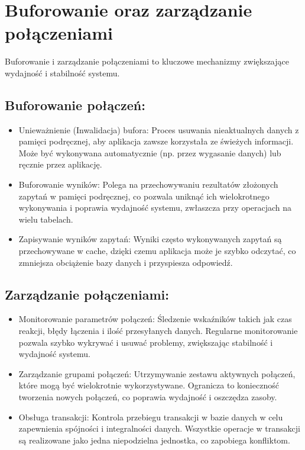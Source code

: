 \documentclass[a4paper,11pt,polish]{sphinxmanual}
\begin{document}
\section{Buforowanie oraz zarządzanie połączeniami}
\label{\detokenize{Wydajnosc-Skalowanie-i-Replikacja/index:buforowanie-oraz-zarzadzanie-polaczeniami}}
\sphinxAtStartPar
Buforowanie i zarządzanie połączeniami to kluczowe mechanizmy zwiększające wydajność i stabilność systemu.


\subsection{Buforowanie połączeń:}
\label{\detokenize{Wydajnosc-Skalowanie-i-Replikacja/index:buforowanie-polaczen}}\begin{itemize}
\item {} 
\sphinxAtStartPar
Unieważnienie (Inwalidacja) bufora: Proces usuwania nieaktualnych danych z pamięci podręcznej, aby aplikacja zawsze korzystała ze świeżych informacji. Może być wykonywana automatycznie (np. przez wygasanie danych) lub ręcznie przez aplikację.

\item {} 
\sphinxAtStartPar
Buforowanie wyników: Polega na przechowywaniu rezultatów złożonych zapytań w pamięci podręcznej, co pozwala uniknąć ich wielokrotnego wykonywania i poprawia wydajność systemu, zwłaszcza przy operacjach na wielu tabelach.

\item {} 
\sphinxAtStartPar
Zapisywanie wyników zapytań: Wyniki często wykonywanych zapytań są przechowywane w cache, dzięki czemu aplikacja może je szybko odczytać, co zmniejsza obciążenie bazy danych i przyspiesza odpowiedź.

\end{itemize}


\subsection{Zarządzanie połączeniami:}
\label{\detokenize{Wydajnosc-Skalowanie-i-Replikacja/index:zarzadzanie-polaczeniami}}\begin{itemize}
\item {} 
\sphinxAtStartPar
Monitorowanie parametrów połączeń: Śledzenie wskaźników takich jak czas reakcji, błędy łączenia i ilość przesyłanych danych. Regularne monitorowanie pozwala szybko wykrywać i usuwać problemy, zwiększając stabilność i wydajność systemu.

\item {} 
\sphinxAtStartPar
Zarządzanie grupami połączeń: Utrzymywanie zestawu aktywnych połączeń, które mogą być wielokrotnie wykorzystywane. Ogranicza to konieczność tworzenia nowych połączeń, co poprawia wydajność i oszczędza zasoby.

\item {} 
\sphinxAtStartPar
Obsługa transakcji: Kontrola przebiegu transakcji w bazie danych w celu zapewnienia spójności i integralności danych. Wszystkie operacje w transakcji są realizowane jako jedna niepodzielna jednostka, co zapobiega konfliktom.

\end{itemize}
\end{document}
